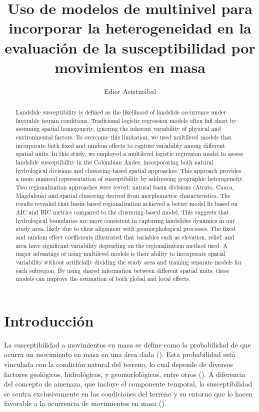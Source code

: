 \documentclass[
  manuscript=article,  
  layout=preprint,  
]{format}
\title{Uso de modelos de multinivel para incorporar la heterogeneidad en la evaluación de la susceptibilidad por movimientos en masa}
\author{Edier Aristizábal}
\affiliation{Departamento de Geociencias y Medio Ambiente, Universidad Nacional de Colombia, Medellín, Colombia}
\begin{document}
\begin{abstract}
Landslide susceptibility is defined as the likelihood of landslide occurrence under favorable terrain conditions. Traditional logistic regression models often fall short by assuming spatial homogeneity, ignoring the inherent variability of physical and environmental factors. To overcome this limitation, we used multilevel models that incorporate both fixed and random effects to capture variability among different spatial units. In this study, we employed a multilevel logistic regression model to assess landslide susceptibility in the Colombian Andes, incorporating both natural hydrological divisions and clustering-based spatial approaches.  This approach provides a more nuanced representation of susceptibility by addressing geographic heterogeneity. Two regionalization approaches were tested: natural basin divisions (Atrato, Cauca, Magdalena) and spatial clustering derived from morphometric characteristics. The results revealed that basin-based regionalization achieved a better model fit based on AIC and BIC metrics compared to the clustering-based model. This suggests that hydrological boundaries are more consistent in capturing landslides dynamics in our study area, likely due to their alignment with geomorphological processes. The fixed and random effect coefficients illustrated that variables such as elevation, relief, and area have significant variability depending on the regionalization method used. A major advantage of using multilevel models is their ability to incorporate spatial variability without artificially dividing the study area and training separate models for each subregion. By using shared information between different spatial units, these models can improve the estimation of both global and local effects.
\end{abstract}

\section{Introducción}
La susceptibilidad a movimientos en masa se define como la probabilidad de que ocurra un movimiento en masa en una área dada (\cite{corominas2014recommendations, brabb1984innovative, fell2008guidelines}). Esta probabilidad está vinculada con la condición natural del terreno, lo cual depende de diversos factores geológicos, hidrológicos, y geomorfológicos, entre otros (\cite{soeters1996, reichenbach2018}). A diferencia del concepto de amenaza, que incluye el componente temporal, la susceptibilidad se centra exclusivamente en las condiciones del terreno y su entorno que lo hacen favorable a la ocurrencia de movimientos en masa (\cite{corominas2014recommendations, fell2008guidelines}).
\end{document}
